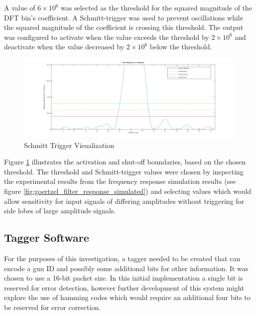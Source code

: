 A value of $6\times 10^{6}$ was selected as the threshold for the squared magnitude of the DFT bin's coefficient. A Schmitt-trigger was used to prevent oscillations while the squared magnitude of the coefficient is crossing this threshold. The output was configured to activate when the value exceeds the threshold by $2\times 10^{6}$ and deactivate when the value decreased by $2\times 10^{6}$ below the threshold.

\begin{figure}[H]
	\centering
	\includegraphics[width=.8\textwidth]{figures/design/schmit_simulation_wide.png}
	\caption{Schmitt Trigger Visualization}
	\label{fig:schmit_simulation_wide}
\end{figure}

Figure \ref{fig:schmit_simulation_wide} illustrates the activation and shut-off boundaries, based on the chosen threshold. The threshold and Schmitt-trigger values were chosen by inspecting the experimental results from the frequency response simulation results (see figure \ref{fig:goertzel_filter_response_simulated}) and selecting values which would allow sensitivity for input signals of differing amplitudes without triggering for side lobes of large amplitude signals.




\subsection{Tagger Software}

For the purposes of this investigation, a tagger needed to be created that can encode a gun ID and possibly some additional bits for other information. It was chosen to use a 16-bit packet size. In this initial implementation a single bit is reserved for error detection, however further development of this system might explore the use of hamming codes which would require an additional four bits to be reserved for error correction.


